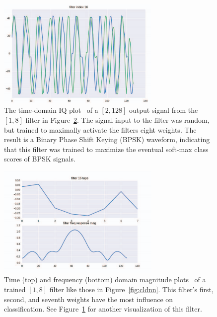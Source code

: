 \begin{figure}[ht!]
	\centering	\includegraphics[width=0.7\textwidth,keepaspectratio]{figs/train_sig.png}
    \caption{The time-domain IQ plot~\cite{modclassback} of a $[2,128]$ output signal from the $[1,8]$ filter in Figure~\ref{fig:filtresp}. The signal input to the filter was random, but trained to maximally activate the filters eight weights. The result is a Binary Phase Shift Keying (BPSK) waveform, indicating that this filter was trained to maximize the eventual soft-max class scores of BPSK signals.}
\label{fig:trainsig}      
\end{figure}

\begin{figure}[ht!]
	\centering	\includegraphics[width=0.7\textwidth,keepaspectratio]{figs/filter_resp.png}
    \caption{Time (top) and frequency (bottom) domain magnitude plots~\cite{modclassback} of a trained $[1,8]$ filter like those in Figure~\ref{fig:cldnn}. This filter's first, second, and seventh weights have the most influence on classification. See Figure~\ref{fig:trainsig} for another visualization of this filter.}
\label{fig:filtresp}      
\end{figure}

